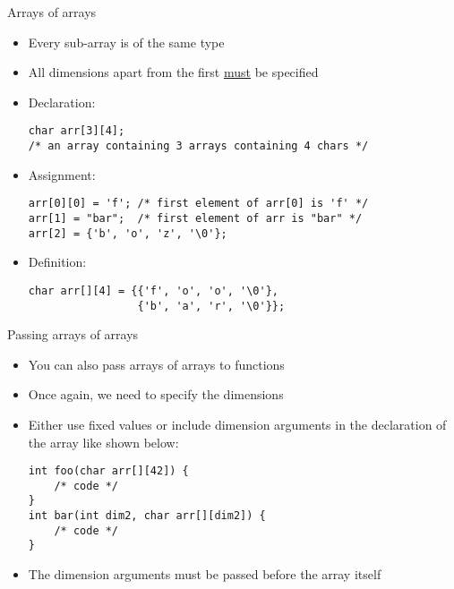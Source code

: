 %
\begin{frame}[fragile]{Arrays of arrays}
	\begin{itemize}
		\item Every sub-array is of the same type
		\item All dimensions apart from the first \underline{must} be specified
		\item Declaration:
		\begin{lstlisting}[numbers=none]
char arr[3][4];
/* an array containing 3 arrays containing 4 chars */
\end{lstlisting}
		\item Assignment:
		\begin{lstlisting}[numbers=none]
arr[0][0] = 'f'; /* first element of arr[0] is 'f' */
arr[1] = "bar";  /* first element of arr is "bar" */
arr[2] = {'b', 'o', 'z', '\0'};
\end{lstlisting}
		\item Definition:
		\begin{lstlisting}[numbers=none]
char arr[][4] = {{'f', 'o', 'o', '\0'},
			     {'b', 'a', 'r', '\0'}};
\end{lstlisting}
	\end{itemize}
\end{frame}
%
\begin{frame}[fragile]{Passing arrays of arrays}
	\begin{itemize}
		\item You can also pass arrays of arrays to functions
		\item Once again, we need to specify the dimensions
		\item Either use fixed values or include dimension arguments in the
		declaration of the array like shown below:
		\begin{lstlisting}[numbers=none]
int foo(char arr[][42]) {
	/* code */
}
int bar(int dim2, char arr[][dim2]) {
	/* code */
}
\end{lstlisting}
	\item The dimension arguments must be passed before the array itself
	\end{itemize}
\end{frame}

